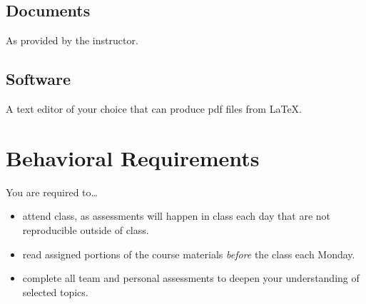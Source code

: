 \documentclass[12pt]{amsart}
\begin{document}
\subsection{Documents} As provided by the instructor.
\subsection{Software} A text editor of your choice that can produce pdf files from \LaTeX.
\section{Behavioral Requirements}

You are required to\ldots
\begin{itemize}
\item attend class, as assessments will happen in class each day that are not reproducible outside of class.
\item read assigned portions of the course materials \textit{before} the class each Monday.
\item complete all team and personal assessments to deepen your understanding of selected topics.
\end{itemize}
\end{document}
